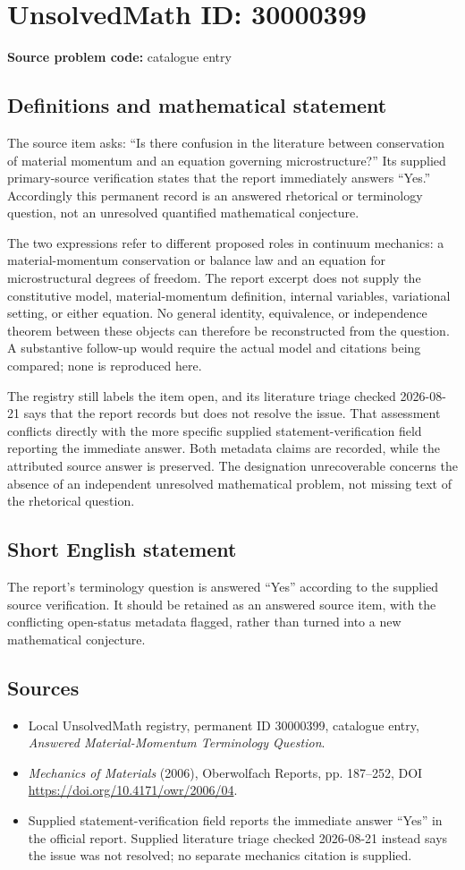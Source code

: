 \documentclass[11pt]{article}
\begin{document}
\section*{UnsolvedMath ID: 30000399}
\textbf{Source problem code:} catalogue entry
\subsection{Definitions and mathematical statement}
The source item asks: ``Is there confusion in the literature between conservation of material momentum and an equation governing microstructure?'' Its supplied primary-source verification states that the report immediately answers ``Yes.'' Accordingly this permanent record is an answered rhetorical or terminology question, not an unresolved quantified mathematical conjecture.

The two expressions refer to different proposed roles in continuum mechanics: a material-momentum conservation or balance law and an equation for microstructural degrees of freedom. The report excerpt does not supply the constitutive model, material-momentum definition, internal variables, variational setting, or either equation. No general identity, equivalence, or independence theorem between these objects can therefore be reconstructed from the question. A substantive follow-up would require the actual model and citations being compared; none is reproduced here.

The registry still labels the item open, and its literature triage checked 2026-08-21 says that the report records but does not resolve the issue. That assessment conflicts directly with the more specific supplied statement-verification field reporting the immediate answer. Both metadata claims are recorded, while the attributed source answer is preserved. The designation unrecoverable concerns the absence of an independent unresolved mathematical problem, not missing text of the rhetorical question.
\subsection{Short English statement}
The report's terminology question is answered ``Yes'' according to the supplied source verification. It should be retained as an answered source item, with the conflicting open-status metadata flagged, rather than turned into a new mathematical conjecture.
\subsection{Sources}
\begin{itemize}
\item Local UnsolvedMath registry, permanent ID 30000399, catalogue entry, \emph{Answered Material-Momentum Terminology Question}.
\item \emph{Mechanics of Materials} (2006), Oberwolfach Reports, pp. 187--252, DOI \url{https://doi.org/10.4171/owr/2006/04}.
\item Supplied statement-verification field reports the immediate answer ``Yes'' in the official report. Supplied literature triage checked 2026-08-21 instead says the issue was not resolved; no separate mechanics citation is supplied.
\end{itemize}
\end{document}
